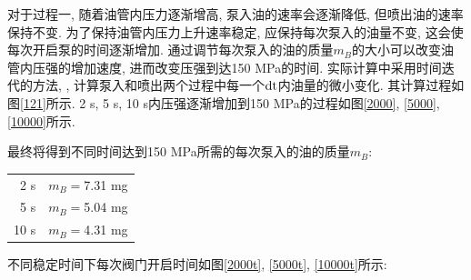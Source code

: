\documentclass{cumcmthesis}
\begin{document}
对于过程一, 随着油管内压力逐渐增高, 泵入油的速率会逐渐降低, 但喷出油的速率保持不变. 为了保持油管内压力上升速率稳定, 应保持每次泵入的油量不变, 这会使每次开启泵的时间逐渐增加. 通过调节每次泵入的油的质量$m_B$的大小可以改变油管内压强的增加速度, 进而改变压强到达150 MPa的时间. 实际计算中采用时间迭代的方法, , 计算泵入和喷出两个过程中每一个$\rm{d}t$内油量的微小变化. 其计算过程如图\ref{121}所示. 2 s, 5 s, 10 s内压强逐渐增加到150 MPa的过程如图\ref{2000}, \ref{5000}, \ref{10000}所示.

最终将得到不同时间达到150 MPa所需的每次泵入的油的质量$m_B$: 
\begin{center}
\begin{tabular}{|r|l|}
    \hline
    2 s & $m_B=$7.31 mg\\ 
    5 s & $m_B=$5.04 mg\\
    10 s & $m_B=$4.31 mg\\
    \hline
\end{tabular}
\end{center}
不同稳定时间下每次阀门开启时间如图\ref{2000t}, \ref{5000t}, \ref{10000t}所示:
\end{document}
